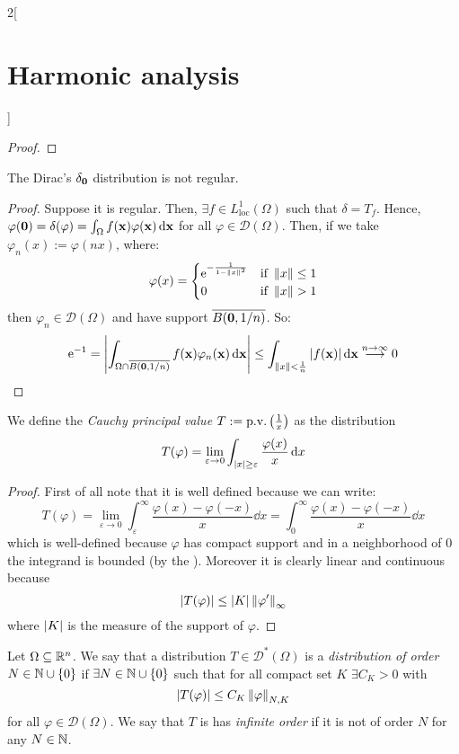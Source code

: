 \documentclass[../../../main_math.tex]{subfiles}
\begin{document}
\begin{multicols}{2}[\section{Harmonic analysis}]
\begin{proof}
  \end{proof}
  \begin{lemma}
    The Dirac's $\delta_{\boldsymbol{\mathrm{0}}}$ distribution is not regular.
  \end{lemma}
  \begin{proof}
    Suppose it is regular. Then, $\exists f\in L_{\mathrm{loc}}^1(\Omega)$ such that $\delta=T_f$. Hence, $\varphi(\boldsymbol{\mathrm{0}})=\delta(\varphi)=\int_\Omega f(\boldsymbol{\mathrm{x}})\varphi(\boldsymbol{\mathrm{x}})\dd{\boldsymbol{\mathrm{x}}}$ for all $\varphi\in\mathcal{D}(\Omega)$. Then, if we take $\varphi_n(x):=\varphi(nx)$, where:
    $$\varphi(x)=\begin{cases}
        \exp{-\frac{1}{1-\norm{x}^2}} & \text{if } \norm{x}\leq 1 \\
        0                             & \text{if } \norm{x}> 1
      \end{cases}
    $$
    then $\varphi_n\in\mathcal{D}(\Omega)$ and have support $\overline{B(\boldsymbol{\mathrm{0}},1/n)}$. So:
    $$\mathrm{e}^{-1}=\abs{\int_{\Omega\cap \overline{B(\boldsymbol{\mathrm{0}},1/n)}} f(\boldsymbol{\mathrm{x}})\varphi_n(\boldsymbol{\mathrm{x}})\dd{\boldsymbol{\mathrm{x}}}}\leq \int_{\left\|x\right\|<\frac{1}{n}}\abs{f(\boldsymbol{\mathrm{x}})}\dd{\boldsymbol{\mathrm{x}}}\overset{n\to\infty}{\longrightarrow}0$$
  \end{proof}
  \begin{proposition}
    We define the \emph{Cauchy principal value} $T:=\mathrm{p.v.}\left(\frac{1}{x}\right)$ as the distribution
    $$T(\varphi)=\lim_{\varepsilon\to 0}\int_{\abs{x}\geq \varepsilon}\frac{\varphi(x)}{x}\dd{x}$$
  \end{proposition}
  \begin{proof}
    First of all note that it is well defined because we can write:
    $$T(\varphi)=\lim_{\varepsilon\to 0}\int_{\varepsilon}^\infty\frac{\varphi(x)-\varphi(-x)}{x}\dd{x}=\int_{0}^\infty\frac{\varphi(x)-\varphi(-x)}{x}\dd{x}$$
    which is well-defined because $\varphi$ has compact support and in a neighborhood of $0$ the integrand is bounded (by the ). Moreover it is clearly linear and continuous because $$\abs{T(\varphi)}\leq \m{K} \norm{\varphi'}_\infty$$
    where $\abs{K}$ is the measure of the support of $\varphi$.
  \end{proof}
  \begin{definition}
    Let $\Omega\subseteq \mathbb{R}^n$. We say that a distribution $T\in\mathcal{D}^*(\Omega)$ is a \emph{distribution of order $N\in\mathbb{N}\cup\{0\}$} if $\exists N\in\mathbb{N}\cup\{0\}$ such that for all compact set $K$ $\exists C_K>0$ with
    $$\abs{T(\varphi)}\leq C_K\left\|\varphi\right\|_{N,K}$$
    for all $\varphi\in\mathcal{D}(\Omega)$. We say that $T$ is has \emph{infinite order} if it is not of order $N$ for any $N\in\mathbb{N}$.

\end{definition}
\end{multicols}
\end{document}

